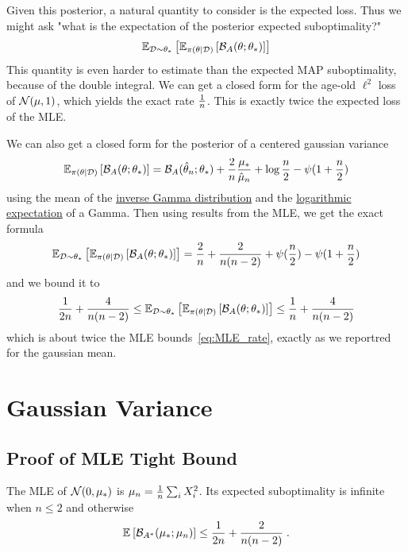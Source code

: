 \documentclass{article}
\newcommand*{\expect}[2][]{\ensuremath{\mathbb{E}_{#1} \left[ #2 \right] }} %
\newcommand{\logpart}{A}
\newcommand{\bregman}{\cB_\logpart}
\newcommand{\bregmanconj}{\cB_{\logpart^*}}
\newcommand{\natp}{\theta}
\begin{document}
Given this posterior, a natural quantity to consider is the expected loss. Thus we might ask "what is the expectation of the posterior expected suboptimality?"
\begin{align}
    \expect[\cD\sim\natp_*]{\expect[\pi(\natp|\cD)]{\bregman(\natp ; \natp_*)}}
\end{align}
This quantity is even harder to estimate than the expected MAP suboptimality, because of the double integral. We can get a closed form for the age-old $\ell^2$ loss of ${\mathcal N}(\mu, 1)$, which yields the exact rate $\frac{1}{n}$. This is exactly twice the expected loss of the MLE.

\begin{example}
	We can also get a closed form for the posterior of a centered gaussian variance 
	\begin{align}
		\expect[\pi(\natp|\cD)]{\bregman(\natp ; \natp_*)} = \bregman(\hat \natp_n ; \natp_*) + \frac{2}{n} \frac{\mu_*}{\hat \mu_n} + \log\frac{n}{2} - \psi(1 + \frac{n}{2})
	\end{align}
	using the mean of the \href{https://en.wikipedia.org/wiki/Inverse-gamma_distribution}{inverse Gamma distribution} and the \href{https://en.wikipedia.org/wiki/Gamma_distribution#Logarithmic_expectation_and_variance}{logarithmic expectation} of a Gamma. 
	Then using results from the MLE, we get the exact formula
	\begin{align}
		\expect[\cD\sim\natp_*]{\expect[\pi(\natp|\cD)]{\bregman(\natp ; \natp_*)}}
		= \frac{2}{n} + \frac{2}{n(n-2)} + \psi(\half[n]) - \psi(1+ \half[n])
	\end{align}
	and we bound it to 
	\begin{align}
		\inv{2n} + \frac{4}{n(n-2)}
		\leq \expect[\cD\sim\natp_*]{\expect[\pi(\natp|\cD)]{\bregman(\natp ; \natp_*)}}
		\leq 
		\inv{n} + \frac{4}{n(n-2)}
	\end{align}
	which is about twice the MLE bounds~\eqref{eq:MLE_rate}, exactly as we reportred for the gaussian mean.
\end{example}


\section{Gaussian Variance}
\subsection{Proof of MLE Tight Bound}
	\begin{theorem}
	The MLE of ${\mathcal N}(0,\mu_*)$ is $\mu_n = \frac{1}{n} \sum_i X_i^2 $.
	Its expected suboptimality is infinite when $n\leq 2$ and otherwise
	\begin{align}
		 \expect{\bregmanconj( \mu_*; \mu_n) }
			\leq \inv{2n} +\frac{2}{n(n-2)} \; .
	\end{align}
	\end{theorem}
	
\end{document}
